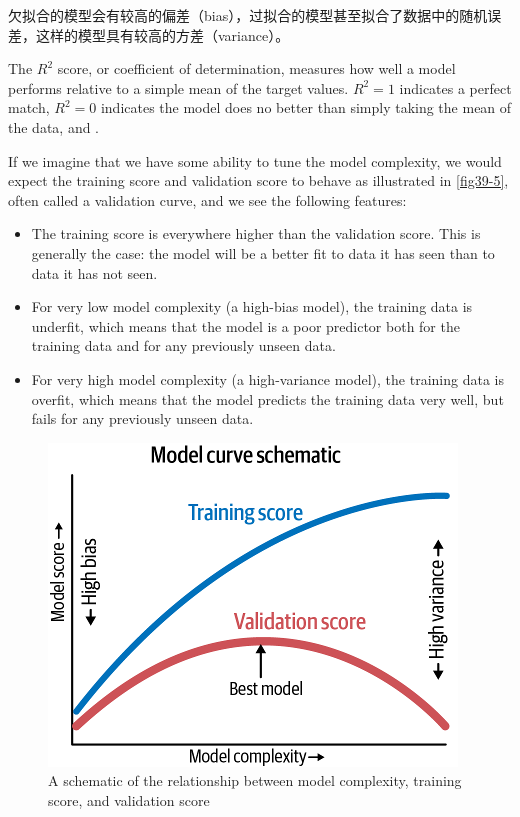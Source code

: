 欠拟合的模型会有较高的偏差（bias），过拟合的模型甚至拟合了数据中的随机误差，这样的模型具有较高的方差（variance）。

The $R^2$ score, or coefficient of determination, measures how
well a model performs relative to a simple mean of the target values. $R^2 = 1$ indicates
a perfect match, $R^2 = 0$ indicates the model does no better than simply taking the
mean of the data, and .

If we imagine that we have some ability to tune the model complexity, we would
expect the training score and validation score to behave as illustrated in \autoref{fig39-5},
often called a validation curve, and we see the following features:
\begin{itemize}
      \item The training score is everywhere higher than the validation score. This is generally the case: the model will be a better fit to data it has seen than to data it has
            not seen.
      \item For very low model complexity (a high-bias model), the training data is underfit,
            which means that the model is a poor predictor both for the training data and for
            any previously unseen data.
      \item For very high model complexity (a high-variance model), the training data is
            overfit, which means that the model predicts the training data very well, but fails
            for any previously unseen data.
\end{itemize}

\begin{figure}
      \centering
      \includegraphics{../img/fig39-5.png}
      \caption{A schematic of the relationship between model complexity, training score, and validation score}
      \label{fig39-5}
\end{figure}

